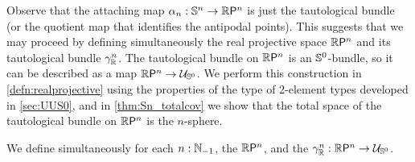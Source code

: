 Observe that the attaching map $\alpha_n:\sphere{n}\to\rprojective{n}$ is just the tautological bundle (or the quotient map that identifies the antipodal points). This suggests that we may proceed by defining simultaneously the real projective space $\rprojective{n}$ and its tautological bundle $\tautfam[\R]{n}$. The tautological bundle on $\rprojective{n}$ is an $\sphere{0}$-bundle, so it can be described as a map $\rprojective{n}\to\UU_{\sphere{0}}$. We perform this construction in \autoref{defn:realprojective} using the properties of the type of 2-element types developed in \autoref{sec:UUS0}, and in \autoref{thm:Sn_totalcov} we show that the total space of the tautological bundle on $\rprojective{n}$ is the $n$-sphere. 

\begin{defn}\label{defn:realprojective}
We define simultaneously for each $n:\N_{-1}$, 
the  $\rprojective{n}$, 
and the  $\tautfam[\R]{n}:\rprojective{n}\to \UU_{\sphere{0}}$.
\end{defn}


